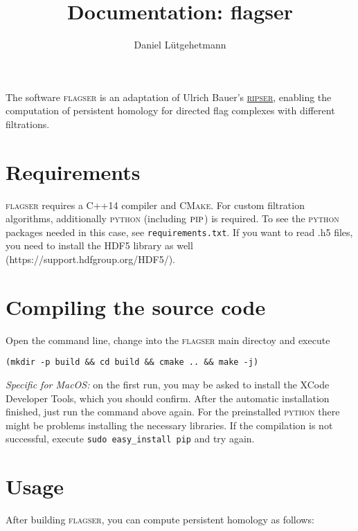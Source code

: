 \documentclass{amsart}
\theoremstyle{definition}
\begin{document}
\title{Documentation: flagser}

\author{Daniel Lütgehetmann}
\address{University of Aberdeen, Aberdeen, United Kingdom}

\maketitle

\noindent
The software \textsc{flagser} is an adaptation of Ulrich Bauer's
\href{https://github.com/Ripser/ripser}{\textsc{ripser}}, enabling the computation of persistent
homology for directed flag complexes with different filtrations.

\section{Requirements}
\noindent
\textsc{flagser} requires a C++14 compiler and \textsc{CMake}.
For custom filtration algorithms, additionally \textsc{python} (including $\textsc{pip}$) is required.
To see the \textsc{python} packages needed in this case, see \texttt{requirements.txt}.
If you want to read .h5 files, you need to install the HDF5 library as well (https://support.hdfgroup.org/HDF5/).

\section{Compiling the source code}
\noindent
Open the command line, change into the \textsc{flagser} main directoy and execute

\vspace{1em}

\begin{verbatim}(mkdir -p build && cd build && cmake .. && make -j)\end{verbatim}

\vspace{1em}

\noindent
\textit{Specific for MacOS:} on the first run, you may be asked to install the XCode Developer Tools, which you should confirm.
After the automatic installation finished, just run the command above again.
For the preinstalled \textsc{python} there might be problems installing the necessary libraries.
If the compilation is not successful, execute \texttt{sudo easy\_install pip} and try again.

\section{Usage}
\noindent
After building \textsc{flagser}, you can compute persistent homology as follows:
\end{document}
